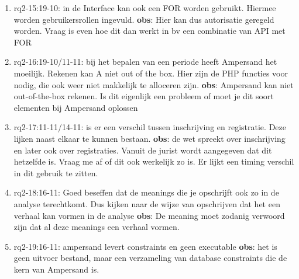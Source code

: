 \begin{enumerate}
    \item rq2-15:19-10: in de Interface kan ook een FOR worden gebruikt. Hiermee worden gebruikersrollen ingevuld.
    \newline\textbf{obs}: Hier kan dus autorisatie geregeld worden. Vraag is even hoe dit dan werkt in bv een combinatie van API met FOR
    
    \item rq2-16:19-10/11-11: bij het bepalen van een periode heeft Ampersand het moeilijk. Rekenen kan A niet out of the box. Hier zijn de PHP functies voor nodig, die ook weer niet makkelijk te alloceren zijn.
    \newline\textbf{obs}: Ampersand kan niet out-of-the-box rekenen. 
    Is dit eigenlijk een probleem of moet je dit soort elementen bij Ampersand oplossen
    
    \item rq2-17:11-11/14-11: is er een verschil tussen inschrijving en registratie. Deze lijken naast elkaar te kunnen bestaan.
    \newline\textbf{obs}: de wet spreekt over inschrijving en later ook over registraties. 
    Vanuit de jurist wordt aangegeven dat dit hetzelfde is.
    Vraag me af of dit ook werkelijk zo is. 
    Er lijkt een timing verschil in dit gebruik te zitten.
    
    \item rq2-18:16-11: Goed beseffen dat de meanings die je opschrijft ook zo in de analyse terechtkomt. Dus kijken naar de wijze van opschrijven dat het een verhaal kan vormen in de analyse
    \newline\textbf{obs}: De meaning moet zodanig verwoord zijn dat al deze meanings een verhaal vormen.
    
    \item rq2-19:16-11: ampersand levert constraints en geen executable
    \newline\textbf{obs}: het is geen uitvoer bestand, maar een verzameling van database constraints die de kern van Ampersand is.
    
\end{enumerate}


\newpage

